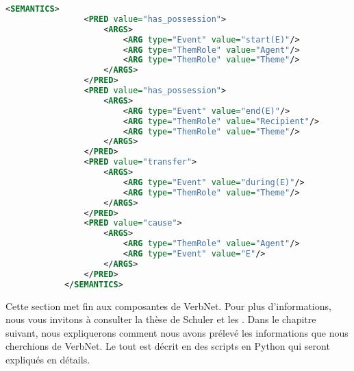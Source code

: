 \begin{lstlisting}[language=Xml, caption=Les prédicats sémantiques, label=cadresem]
<SEMANTICS>
                <PRED value="has_possession">
                    <ARGS>
                        <ARG type="Event" value="start(E)"/>
                        <ARG type="ThemRole" value="Agent"/>
                        <ARG type="ThemRole" value="Theme"/>
                    </ARGS>
                </PRED>
                <PRED value="has_possession">
                    <ARGS>
                        <ARG type="Event" value="end(E)"/>
                        <ARG type="ThemRole" value="Recipient"/>
                        <ARG type="ThemRole" value="Theme"/>
                    </ARGS>
                </PRED>
                <PRED value="transfer">
                    <ARGS>
                        <ARG type="Event" value="during(E)"/>
                        <ARG type="ThemRole" value="Theme"/>
                    </ARGS>
                </PRED>
                <PRED value="cause">
                    <ARGS>
                        <ARG type="ThemRole" value="Agent"/>
                        <ARG type="Event" value="E"/>
                    </ARGS>
                </PRED>
            </SEMANTICS>
\end{lstlisting}

Cette section met fin aux composantes de VerbNet. Pour plus d'informations, nous vous invitons à consulter la thèse de Schuler \cite{SchulerVerbnetBroadcoverageComprehensive2005} et les . Dans le chapitre suivant, nous expliquerons comment nous avons prélevé les informations que nous cherchions de VerbNet. Le tout est décrit en des scripts en Python qui seront expliqués en détails.
